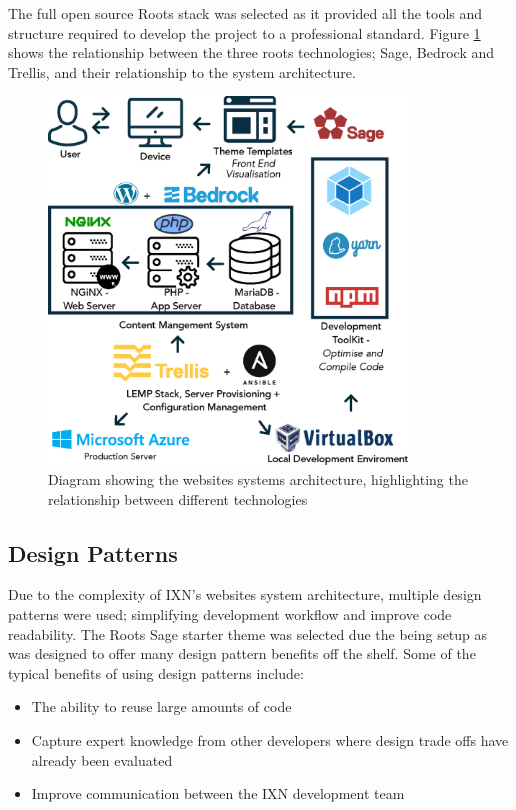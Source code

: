 \documentclass[fontsize=10pt]{extarticle}
\numberwithin{figure}{section} %
\providecommand{\tightlist}{%
  \setlength{\itemsep}{0pt}\setlength{\parskip}{0pt}}
\begin{document}
The full open source Roots stack \cite{rootsweb} was selected as it
provided all the tools and structure required to develop the project to
a professional standard. Figure \ref{systemarchitecture} shows the
relationship between the three roots technologies; Sage, Bedrock and
Trellis, and their relationship to the system architecture.

\begin{figure}[H]
\centering
\includegraphics[trim = 0 0 0 0, clip, width=0.85\textwidth]{SystemArchitecture.eps}
\caption{Diagram showing the websites systems architecture, highlighting the relationship between different technologies}
\label{systemarchitecture}
\end{figure}

\hypertarget{design-patterns}{%
\subsection{Design Patterns}\label{design-patterns}}

Due to the complexity of IXN's websites system architecture, multiple
design patterns were used; simplifying development workflow and improve
code readability. The Roots Sage starter theme was selected due the
being setup as was designed to offer many design pattern benefits off
the shelf. Some of the typical benefits of using design patterns
include:

\begin{itemize}
\tightlist
\item
  The ability to reuse large amounts of code \cite{deanDesignPatterns}
\item
  Capture expert knowledge from other developers where design trade offs
  have already been evaluated
\item
  Improve communication between the IXN development team
\end{itemize}
\end{document}
